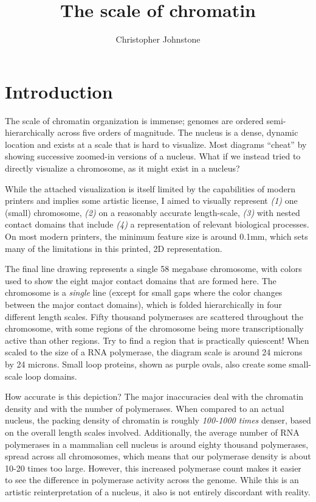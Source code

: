 \documentclass[11pt]{article}
\title{The scale of chromatin}
\author{Christopher Johnstone}
\date{}
\begin{document}
\maketitle

\section{Introduction}

The scale of chromatin organization is immense; genomes are ordered semi-hierarchically across five orders of magnitude. The nucleus is a dense, dynamic location and exists at a scale that is hard to visualize. Most diagrams ``cheat'' by showing successive zoomed-in versions of a nucleus. What if we instead tried to directly visualize a chromosome, as it might exist in a nucleus?

While the attached visualization is itself limited by the capabilities of modern printers and implies some artistic license, I aimed to visually represent \textit{(1)} one (small) chromosome, \textit{(2)} on a reasonably accurate length-scale, \textit{(3)} with nested contact domains that include \textit{(4)} a representation of relevant biological processes. On most modern printers, the minimum feature size is around 0.1mm, which sets many of the limitations in this printed, 2D representation.

The final line drawing represents a single 58 megabase chromosome, with colors used to show the eight major contact domains that are formed here. The chromosome is a \emph{single} line (except for small gaps where the color changes between the major contact domains), which is folded hierarchically in four different length scales. Fifty thousand polymerases are scattered throughout the chromosome, with some regions of the chromosome being more transcriptionally active than other regions. Try to find a region that is practically quiescent!  When scaled to the size of a RNA polymerase, the diagram scale is around 24 microns by 24 microns. Small loop proteins, shown as purple ovals, also create some small-scale loop domains. 

How accurate is this depiction? The major inaccuracies deal with the chromatin density and with the number of polymerases. When compared to an actual nucleus, the packing density of chromatin is roughly \emph{100-1000 times} denser, based on the overall length scales involved. Additionally, the average number of RNA polymerases in a mammalian cell nucleus is around eighty thousand polymerases, spread across all chromosomes, which means that our polymerase density is about 10-20 times too large. However, this increased polymerase count makes it easier to see the difference in polymerase activity across the genome. While this is an artistic reinterpretation of a nucleus, it also is not entirely discordant with reality.
\end{document}

